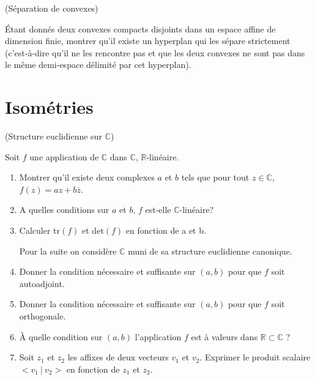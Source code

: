 \documentclass[a4paper,12pt,reqno]{amsart}
\begin{document}
\begin{exo} (Séparation de convexes)

  Étant donnés deux convexes compacts disjoints dans un espace affine de dimension finie, montrer qu'il existe un hyperplan qui les sépare strictement (c'est-à-dire qu'il ne les rencontre pas et que les deux convexes ne sont pas dans le même demi-espace délimité par cet hyperplan).
\end{exo}


\section{Isométries}

\begin{exo} (Structure euclidienne sur $\mathbb{C}$)

  Soit $f$ une application de $\mathbb{C}$ dans $\mathbb{C}$, $\mathbb{R}$-linéaire.
  \begin{enumerate}
    \item Montrer qu'il existe deux complexes $a$ et $b$ tels que pour tout $z\in\mathbb{C}$, $f(z)=az+b\overline{z}$.
    \item A quelles conditions sur $a$ et $b$, $f$ est-elle $\mathbb{C}$-linéaire?
    \item Calculer $\mathrm{tr}(f)$ et $\mathrm{det}(f)$ en fonction de a et b.

    \begin{convention}
      Pour la suite on considère $\mathbb{C}$ muni de sa structure euclidienne canonique.
    \end{convention}

    \item Donner la condition nécessaire et suffisante sur $(a,b)$ pour que $f$ soit autoadjoint.
    \item Donner la condition nécessaire et suffisante sur $(a,b)$ pour que $f$ soit orthogonale.
    \item À quelle condition sur $(a,b)$ l'application $f$ est à valeurs dans $\mathbb{R} \subset \mathbb{C}$ ?
    \item Soit $z_{1}$ et $z_{2}$ les affixes de deux vecteurs $v_{1}$ et $v_{2}$.\newline
    Exprimer le produit scalaire $<v_{1} ~|~ v_{2}>$ en fonction de $z_{1}$ et $z_{2}$.
  \end{enumerate}
\end{exo}
\end{document}
